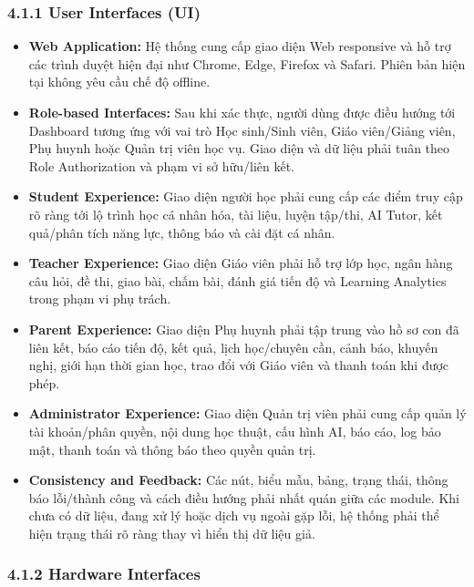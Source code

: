\documentclass[12pt,a4paper,oneside]{report}
\begin{document}
\subsubsection*{4.1.1 User Interfaces (UI)}

\begin{itemize}
    \item \textbf{Web Application:} Hệ thống cung cấp giao diện Web responsive và hỗ trợ các trình duyệt hiện đại như Chrome, Edge, Firefox và Safari. Phiên bản hiện tại không yêu cầu chế độ offline.
    \item \textbf{Role-based Interfaces:} Sau khi xác thực, người dùng được điều hướng tới Dashboard tương ứng với vai trò Học sinh/Sinh viên, Giáo viên/Giảng viên, Phụ huynh hoặc Quản trị viên học vụ. Giao diện và dữ liệu phải tuân theo Role Authorization và phạm vi sở hữu/liên kết.
    \item \textbf{Student Experience:} Giao diện người học phải cung cấp các điểm truy cập rõ ràng tới lộ trình học cá nhân hóa, tài liệu, luyện tập/thi, AI Tutor, kết quả/phân tích năng lực, thông báo và cài đặt cá nhân.
    \item \textbf{Teacher Experience:} Giao diện Giáo viên phải hỗ trợ lớp học, ngân hàng câu hỏi, đề thi, giao bài, chấm bài, đánh giá tiến độ và Learning Analytics trong phạm vi phụ trách.
    \item \textbf{Parent Experience:} Giao diện Phụ huynh phải tập trung vào hồ sơ con đã liên kết, báo cáo tiến độ, kết quả, lịch học/chuyên cần, cảnh báo, khuyến nghị, giới hạn thời gian học, trao đổi với Giáo viên và thanh toán khi được phép.
    \item \textbf{Administrator Experience:} Giao diện Quản trị viên phải cung cấp quản lý tài khoản/phân quyền, nội dung học thuật, cấu hình AI, báo cáo, log bảo mật, thanh toán và thông báo theo quyền quản trị.
    \item \textbf{Consistency and Feedback:} Các nút, biểu mẫu, bảng, trạng thái, thông báo lỗi/thành công và cách điều hướng phải nhất quán giữa các module. Khi chưa có dữ liệu, đang xử lý hoặc dịch vụ ngoài gặp lỗi, hệ thống phải thể hiện trạng thái rõ ràng thay vì hiển thị dữ liệu giả.
\end{itemize}

\subsubsection*{4.1.2 Hardware Interfaces}
\end{document}
